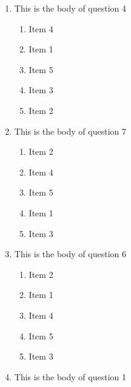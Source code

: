 \documentclass[amsfonts,bezier,leqno,fleqn,12pt,a4paper]{article}
\begin{document}
{{{\begin{large}
\begin{enumerate}
\begin{enumerate}
\item  Item 4
\item  Item 3
\item  Item 1
\item  Item 2
\item  Item 5

\end{enumerate}
\newpage


\item This is the body of question 4
\vspace {0.3in}
\setcounter{equation}{0}

\begin{enumerate}
\item  Item 4
\item  Item 1
\item  Item 5
\item  Item 3
\item  Item 2

\end{enumerate}

\vspace {3.5cm}


\item This is the body of question 7
\vspace {0.3in}
\setcounter{equation}{0}

\begin{enumerate}
\item  Item 2
\item  Item 4
\item  Item 5
\item  Item 1
\item  Item 3

\end{enumerate}
\newpage


\item This is the body of question 6
\vspace {0.3in}
\setcounter{equation}{0}

\begin{enumerate}
\item  Item 2
\item  Item 1
\item  Item 4
\item  Item 5
\item  Item 3

\end{enumerate}

\vspace {3.5cm}


\item This is the body of question 1
\vspace {0.3in}
\setcounter{equation}{0}


\end{enumerate}
\end{large}}}}
\end{document}
